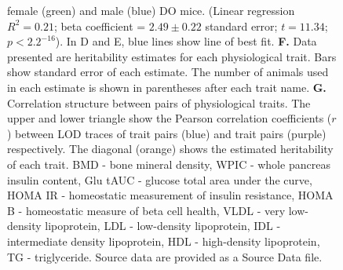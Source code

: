 \documentclass[
]{article}
\begin{document}
\begin{figure}[ht!]
{female (green) and male (blue) DO mice. (Linear regression 
$R^2 = 0.21$; beta coefficient = $2.49\pm 0.22$ 
standard error; $t = 11.34$; $p < 2.2^{-16}$). In D and E,
blue lines show line of best fit. \textbf{F.} Data 
presented are heritability estimates for each physiological trait. 
Bars show standard error of each estimate. The number of animals 
used in each estimate is shown in parentheses after each trait name. 
\textbf{G.} Correlation structure between pairs of physiological 
traits. The upper and lower triangle show the Pearson correlation 
coefficients ($r$) between LOD traces of trait pairs (blue) and trait 
pairs (purple) respectively. The diagonal (orange) shows the estimated 
heritability of each trait. BMD - bone mineral density, WPIC - whole 
pancreas insulin content, Glu tAUC - glucose total area under the 
curve, HOMA IR - homeostatic measurement of insulin resistance, 
HOMA B - homeostatic measure of beta cell health, VLDL - very 
low-density lipoprotein, LDL - low-density lipoprotein, IDL - intermediate 
density lipoprotein, HDL - high-density lipoprotein, TG - triglyceride. 
Source data are provided as a Source Data file.
}
\label{fig:trait_overview}
\end{figure}
\end{document}
